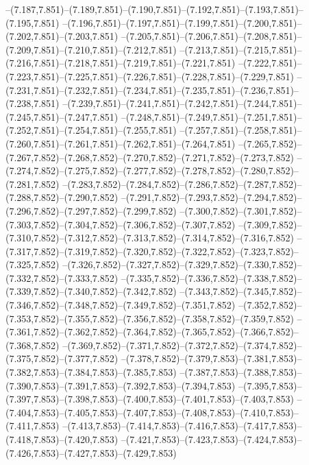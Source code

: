   --(7.187,7.851)--(7.189,7.851)--(7.190,7.851)--(7.192,7.851)--(7.193,7.851)--(7.195,7.851)%
  --(7.196,7.851)--(7.197,7.851)--(7.199,7.851)--(7.200,7.851)--(7.202,7.851)--(7.203,7.851)%
  --(7.205,7.851)--(7.206,7.851)--(7.208,7.851)--(7.209,7.851)--(7.210,7.851)--(7.212,7.851)%
  --(7.213,7.851)--(7.215,7.851)--(7.216,7.851)--(7.218,7.851)--(7.219,7.851)--(7.221,7.851)%
  --(7.222,7.851)--(7.223,7.851)--(7.225,7.851)--(7.226,7.851)--(7.228,7.851)--(7.229,7.851)%
  --(7.231,7.851)--(7.232,7.851)--(7.234,7.851)--(7.235,7.851)--(7.236,7.851)--(7.238,7.851)%
  --(7.239,7.851)--(7.241,7.851)--(7.242,7.851)--(7.244,7.851)--(7.245,7.851)--(7.247,7.851)%
  --(7.248,7.851)--(7.249,7.851)--(7.251,7.851)--(7.252,7.851)--(7.254,7.851)--(7.255,7.851)%
  --(7.257,7.851)--(7.258,7.851)--(7.260,7.851)--(7.261,7.851)--(7.262,7.851)--(7.264,7.851)%
  --(7.265,7.852)--(7.267,7.852)--(7.268,7.852)--(7.270,7.852)--(7.271,7.852)--(7.273,7.852)%
  --(7.274,7.852)--(7.275,7.852)--(7.277,7.852)--(7.278,7.852)--(7.280,7.852)--(7.281,7.852)%
  --(7.283,7.852)--(7.284,7.852)--(7.286,7.852)--(7.287,7.852)--(7.288,7.852)--(7.290,7.852)%
  --(7.291,7.852)--(7.293,7.852)--(7.294,7.852)--(7.296,7.852)--(7.297,7.852)--(7.299,7.852)%
  --(7.300,7.852)--(7.301,7.852)--(7.303,7.852)--(7.304,7.852)--(7.306,7.852)--(7.307,7.852)%
  --(7.309,7.852)--(7.310,7.852)--(7.312,7.852)--(7.313,7.852)--(7.314,7.852)--(7.316,7.852)%
  --(7.317,7.852)--(7.319,7.852)--(7.320,7.852)--(7.322,7.852)--(7.323,7.852)--(7.325,7.852)%
  --(7.326,7.852)--(7.327,7.852)--(7.329,7.852)--(7.330,7.852)--(7.332,7.852)--(7.333,7.852)%
  --(7.335,7.852)--(7.336,7.852)--(7.338,7.852)--(7.339,7.852)--(7.340,7.852)--(7.342,7.852)%
  --(7.343,7.852)--(7.345,7.852)--(7.346,7.852)--(7.348,7.852)--(7.349,7.852)--(7.351,7.852)%
  --(7.352,7.852)--(7.353,7.852)--(7.355,7.852)--(7.356,7.852)--(7.358,7.852)--(7.359,7.852)%
  --(7.361,7.852)--(7.362,7.852)--(7.364,7.852)--(7.365,7.852)--(7.366,7.852)--(7.368,7.852)%
  --(7.369,7.852)--(7.371,7.852)--(7.372,7.852)--(7.374,7.852)--(7.375,7.852)--(7.377,7.852)%
  --(7.378,7.852)--(7.379,7.853)--(7.381,7.853)--(7.382,7.853)--(7.384,7.853)--(7.385,7.853)%
  --(7.387,7.853)--(7.388,7.853)--(7.390,7.853)--(7.391,7.853)--(7.392,7.853)--(7.394,7.853)%
  --(7.395,7.853)--(7.397,7.853)--(7.398,7.853)--(7.400,7.853)--(7.401,7.853)--(7.403,7.853)%
  --(7.404,7.853)--(7.405,7.853)--(7.407,7.853)--(7.408,7.853)--(7.410,7.853)--(7.411,7.853)%
  --(7.413,7.853)--(7.414,7.853)--(7.416,7.853)--(7.417,7.853)--(7.418,7.853)--(7.420,7.853)%
  --(7.421,7.853)--(7.423,7.853)--(7.424,7.853)--(7.426,7.853)--(7.427,7.853)--(7.429,7.853)%
